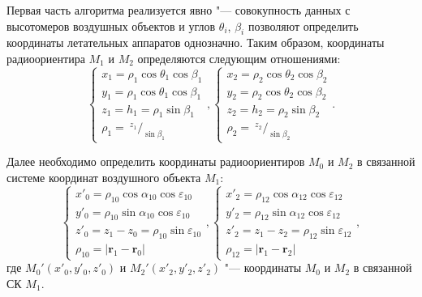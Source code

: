 \documentclass[a4paper,12pt]{article}
\begin{document}
Первая часть алгоритма реализуется явно "--- совокупность данных с высотомеров воздушных
объектов и углов $\theta_i$, $\beta_i$ позволяют определить координаты летательных
аппаратов однозначно. Таким образом, координаты радиоориентира $M_1$ и $M_2$ определяются следующим
отношениями:
\begin{equation}
    \begin{cases}
        x_1 = \rho_1 \cos\theta_1 \cos\beta_1 \\
        y_1 = \rho_1 \cos\theta_1 \cos\beta_1 \\
        z_1 = h_1 = \rho_1 \sin\beta_1 \\
        \rho_1 = ~^{z_1}/_{\sin\beta_1}
    \end{cases},
    \begin{cases}
        x_2 = \rho_2 \cos\theta_2 \cos\beta_2 \\
        y_2 = \rho_2 \cos\theta_2 \cos\beta_2 \\
        z_2 = h_2 = \rho_2 \sin\beta_2 \\
        \rho_2 = ~^{z_2}/_{\sin\beta_2}
    \end{cases}.
\end{equation}

Далее необходимо определить координаты радиоориентиров $M_0$ и $M_2$ в связанной системе координат
воздушного объекта $M_1$:
\begin{equation}
    \begin{cases}
        x'_0 = \rho_{10} \cos\alpha_{10} \cos\varepsilon_{10} \\
        y'_0 = \rho_{10} \sin\alpha_{10} \cos\varepsilon_{10} \\
        z'_0 = z_1 - z_0 = \rho_{10} \sin\varepsilon_{10} \\
        \rho_{10} = |\mathbf{r}_1 - \mathbf{r}_0|
    \end{cases},
    \begin{cases}
        x'_2 = \rho_{12} \cos\alpha_{12} \cos\varepsilon_{12} \\
        y'_2 = \rho_{12} \sin\alpha_{12} \cos\varepsilon_{12} \\
        z'_2 = z_1 - z_2 = \rho_{12} \sin\varepsilon_{12} \\
        \rho_{12} = |\mathbf{r}_1 - \mathbf{r}_2|
    \end{cases},
\end{equation}
где $M_0'\left(x'_0, y'_0, z'_0\right)$ и $M_2'\left(x'_2, y'_2, z'_2\right)$
"--- координаты $M_0$ и $M_2$ в связанной СК $M_1$.
\end{document}
